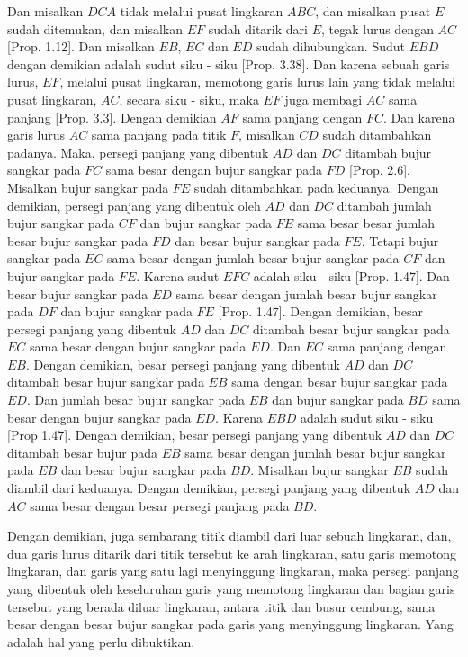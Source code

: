 \documentclass[a4paper]{book}
\begin{document}
Dan misalkan $DCA$ tidak melalui pusat lingkaran $ABC$, dan misalkan pusat $E$
sudah ditemukan, dan misalkan $EF$ sudah ditarik dari $E$, tegak lurus dengan
$AC$ [Prop. 1.12]. Dan misalkan $EB$, $EC$ dan $ED$ sudah dihubungkan. Sudut
$EBD$ dengan demikian adalah sudut siku - siku [Prop. 3.38]. Dan karena sebuah
garis lurus, $EF$, melalui pusat lingkaran, memotong garis lurus lain yang tidak
melalui pusat lingkaran, $AC$, secara siku - siku, maka $EF$ juga membagi $AC$
sama panjang [Prop. 3.3]. Dengan demikian $AF$ sama panjang dengan $FC$. Dan
karena garis lurus $AC$ sama panjang pada titik $F$, misalkan $CD$ sudah 
ditambahkan padanya. Maka, persegi panjang yang dibentuk $AD$ dan $DC$ ditambah
bujur sangkar pada $FC$ sama besar dengan bujur sangkar pada $FD$ [Prop. 2.6]. 
Misalkan bujur sangkar pada $FE$ sudah ditambahkan pada keduanya. Dengan 
demikian, persegi panjang yang dibentuk oleh $AD$ dan $DC$ ditambah jumlah
bujur sangkar pada $CF$ dan bujur sangkar pada $FE$ sama besar besar jumlah
besar bujur sangkar pada $FD$ dan besar bujur sangkar pada $FE$. Tetapi
bujur sangkar pada $EC$ sama besar dengan jumlah besar bujur sangkar pada 
$CF$ dan bujur sangkar pada $FE$. Karena sudut $EFC$ adalah siku - siku
[Prop. 1.47]. Dan besar bujur sangkar pada $ED$ sama besar dengan jumlah
besar bujur sangkar pada  $DF$ dan bujur sangkar pada $FE$ [Prop. 1.47].
Dengan demikian, besar persegi panjang yang dibentuk $AD$ dan $DC$ ditambah
besar bujur sangkar pada $EC$ sama besar dengan bujur sangkar pada $ED$.
Dan $EC$ sama panjang dengan $EB$. Dengan demikian, besar persegi panjang
yang dibentuk $AD$ dan $DC$ ditambah besar bujur sangkar pada $EB$ sama dengan 
besar bujur sangkar pada $ED$. Dan jumlah besar bujur sangkar pada $EB$ dan
bujur sangkar pada $BD$ sama besar dengan bujur sangkar pada $ED$. Karena $EBD$
adalah sudut siku - siku [Prop 1.47]. Dengan demikian, besar persegi panjang yang
dibentuk $AD$ dan $DC$ ditambah besar bujur pada $EB$ sama besar dengan jumlah 
besar bujur sangkar pada $EB$ dan besar bujur sangkar pada $BD$. Misalkan bujur
sangkar $EB$ sudah diambil dari keduanya. Dengan demikian, persegi panjang yang
dibentuk $AD$ dan $AC$ sama besar dengan besar persegi panjang pada  $BD$.

Dengan demikian, juga sembarang titik diambil dari luar sebuah lingkaran, dan, 
dua garis lurus ditarik dari titik tersebut ke arah lingkaran, satu garis memotong
lingkaran, dan garis yang satu lagi menyinggung lingkaran, maka persegi panjang
yang dibentuk oleh keseluruhan garis yang memotong lingkaran dan bagian garis 
tersebut yang berada diluar lingkaran, antara titik dan busur cembung, sama 
besar dengan besar bujur sangkar pada garis yang menyinggung lingkaran. Yang
adalah hal yang perlu dibuktikan.
\end{document}
